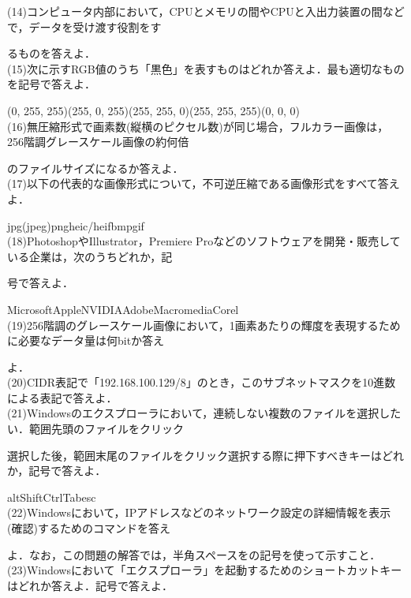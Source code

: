 (14)コンピュータ内部において，CPUとメモリの間やCPUと入出力装置の間などで，データを受け渡す役割をす\par\quad るものを答えよ．\\
(15)次に示すRGB値のうち「黒色」を表すものはどれか答えよ．最も適切なものを記号で答えよ．\par\quad
{}(0, 255, 255)\quad {}(255, 0, 255)\quad {}(255, 255, 0)\quad {}(255, 255, 255)\quad {}(0, 0, 0)\\
(16)無圧縮形式で画素数(縦横のピクセル数)が同じ場合，フルカラー画像は，256階調グレースケール画像の約何倍\par\quad のファイルサイズになるか答えよ．\\
(17)以下の代表的な画像形式について，不可逆圧縮である画像形式をすべて答えよ．\par\quad
{}jpg(jpeg)\quad {}png\quad {}heic/heif\quad {}bmp\quad {}gif\\
(18)PhotoshopやIllustrator，Premiere Proなどのソフトウェアを開発・販売している企業は，次のうちどれか，記\par\quad 号で答えよ．\par\quad
{}Microsoft\quad {}Apple\quad {}NVIDIA\quad {}Adobe\quad {}Macromedia\quad {}Corel\\
(19)256階調のグレースケール画像において，1画素あたりの輝度を表現するために必要なデータ量は何bitか答え\par\quad よ．\\
(20)CIDR表記で「192.168.100.129/8」のとき，このサブネットマスクを10進数による表記で答えよ．\\
(21)Windowsのエクスプローラにおいて，連続しない複数のファイルを選択したい．範囲先頭のファイルをクリック\par\quad 選択した後，範囲末尾のファイルをクリック選択する際に押下すべきキーはどれか，記号で答えよ．\par\quad
{}alt\quad {}Shift\quad {}Ctrl\quad {}Tab\quad {}esc\\
(22)Windowsにおいて，IPアドレスなどのネットワーク設定の詳細情報を表示(確認)するためのコマンドを答え\par\quad よ．なお，この問題の解答では，半角スペースを\textvisiblespace の記号を使って示すこと．\\
(23)Windowsにおいて「エクスプローラ」を起動するためのショートカットキーはどれか答えよ．記号で答えよ．\par\quad
